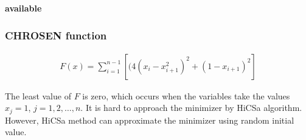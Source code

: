 \documentclass[final,1p,times]{elsarticle}
\begin{document}
\textbf{available}

\newpage

\subsubsection{CHROSEN function}
\label{subsec:CHROSEN}

\begin{align}
	F(x) = \sum_{i=1}^{n-1}[(4(x_i-x_{i+1}^2)^2 + (1-x_{i+1})^2]
	\label{} \end{align}

The least value of $F$ is zero, which occurs when the variables take the values
$x_j=1$, $j=1,2,\dots,n$.
It is hard to
approach the minimizer by HiCSa algorithm. However, HiCSa method
can approximate the minimizer using random initial value.
\end{document}
